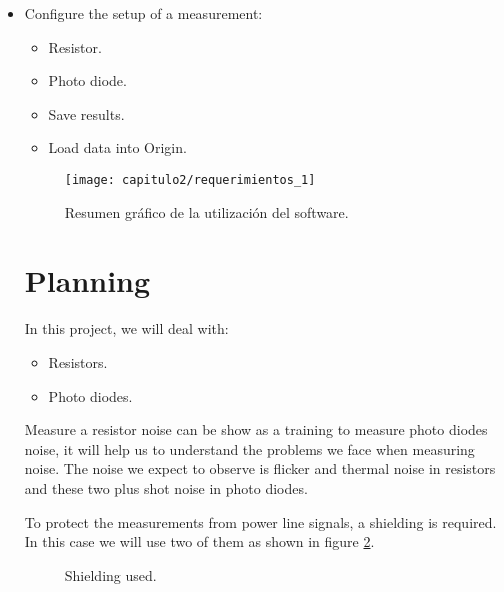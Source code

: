 \begin{itemize}
	\item Configure the setup of a measurement:
	\begin{itemize}
		\item Resistor.	
		\item Photo diode.
		\item Save results.
		\item Load data into Origin.
	\end{itemize}
 
\smallskip	
\begin{figure}[H]%
\noindent \begin{centering}
\texttt{[image: capitulo2/requerimientos\_1]}
\par\end{centering}
\smallskip
\caption{\label{fig:esquema_sistem_caract} Resumen gráfico de la utilización del software.}
\end{figure}

\section{Planning}

In this project, we will deal with:

\begin{itemize}
	\item Resistors.
	\item Photo diodes.
\end{itemize} 

Measure a resistor noise can be show as a training to measure photo diodes noise, it will help us to understand the problems we face when measuring noise. The noise we expect to observe is flicker and thermal noise in resistors and these two plus shot noise in photo diodes.

To protect the measurements from power line signals, a shielding is required. In this case we will use two of them as shown in figure \ref{fig:shielding}.

\begin{figure}[H]%
\noindent \begin{centering}
\hspace{0.5cm}
\vspace{0.1cm}
\bigskip
\caption{\label{fig:shielding} Shielding used.}
\par\end{centering}
\end{figure} 


\end{itemize}
